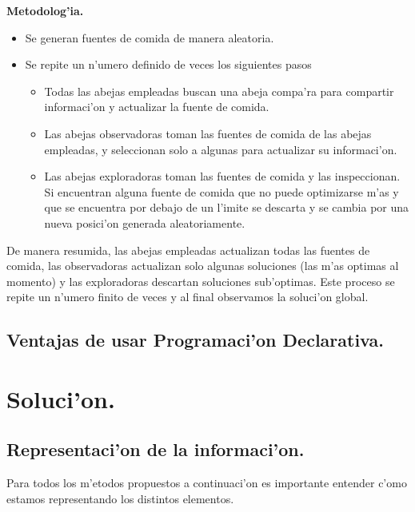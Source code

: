 \documentclass[12pt]{article}
\begin{document}
    \textbf{Metodolog'ia.}
    \begin{itemize}
        \item Se generan fuentes de comida de manera aleatoria.
        \item Se repite un n'umero definido de veces los siguientes pasos
            \begin{itemize}
                \setlength\itemsep{0em}
                \item Todas las abejas empleadas buscan una abeja compa'ra para compartir informaci'on y actualizar
                    la fuente de comida.
                \item Las abejas observadoras toman las fuentes de comida de las abejas empleadas, y seleccionan
                    solo a algunas para actualizar su informaci'on.
                \item Las abejas exploradoras toman las fuentes de comida y las inspeccionan. Si encuentran
                alguna fuente de comida que no puede optimizarse m'as y que se encuentra por debajo de un l'imite
                se descarta y se cambia por una nueva posici'on generada aleatoriamente.

            \end{itemize}

    \end{itemize}

    De manera resumida, las abejas empleadas actualizan todas las fuentes de comida, las observadoras
    actualizan solo algunas soluciones (las m'as optimas al momento) y las exploradoras descartan soluciones
    sub'optimas. Este proceso se repite un n'umero finito de veces y al final observamos
    la soluci'on global.

    \subsection{Ventajas de usar Programaci'on Declarativa.}




    \section{Soluci'on.}

    \subsection{Representaci'on de la informaci'on.}
    Para todos los m'etodos propuestos a continuaci'on es importante
    entender c'omo estamos representando los distintos
    elementos.
\end{document}
